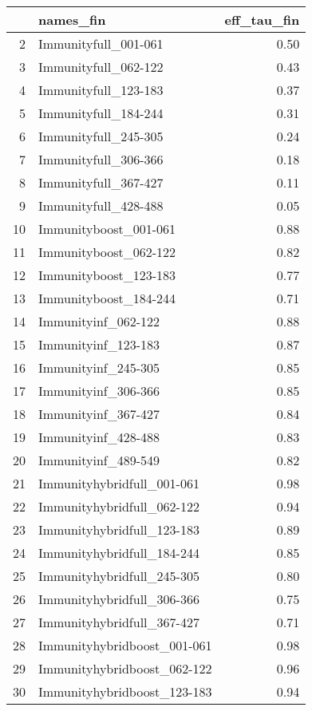 \begin{table}[ht]
\centering
\begin{tabular}{rlr}
  \hline
 & names\_fin & eff\_tau\_fin \\ 
  \hline
2 & Immunityfull\_001-061 & 0.50 \\ 
  3 & Immunityfull\_062-122 & 0.43 \\ 
  4 & Immunityfull\_123-183 & 0.37 \\ 
  5 & Immunityfull\_184-244 & 0.31 \\ 
  6 & Immunityfull\_245-305 & 0.24 \\ 
  7 & Immunityfull\_306-366 & 0.18 \\ 
  8 & Immunityfull\_367-427 & 0.11 \\ 
  9 & Immunityfull\_428-488 & 0.05 \\ 
  10 & Immunityboost\_001-061 & 0.88 \\ 
  11 & Immunityboost\_062-122 & 0.82 \\ 
  12 & Immunityboost\_123-183 & 0.77 \\ 
  13 & Immunityboost\_184-244 & 0.71 \\ 
  14 & Immunityinf\_062-122 & 0.88 \\ 
  15 & Immunityinf\_123-183 & 0.87 \\ 
  16 & Immunityinf\_245-305 & 0.85 \\ 
  17 & Immunityinf\_306-366 & 0.85 \\ 
  18 & Immunityinf\_367-427 & 0.84 \\ 
  19 & Immunityinf\_428-488 & 0.83 \\ 
  20 & Immunityinf\_489-549 & 0.82 \\ 
  21 & Immunityhybridfull\_001-061 & 0.98 \\ 
  22 & Immunityhybridfull\_062-122 & 0.94 \\ 
  23 & Immunityhybridfull\_123-183 & 0.89 \\ 
  24 & Immunityhybridfull\_184-244 & 0.85 \\ 
  25 & Immunityhybridfull\_245-305 & 0.80 \\ 
  26 & Immunityhybridfull\_306-366 & 0.75 \\ 
  27 & Immunityhybridfull\_367-427 & 0.71 \\ 
  28 & Immunityhybridboost\_001-061 & 0.98 \\ 
  29 & Immunityhybridboost\_062-122 & 0.96 \\ 
  30 & Immunityhybridboost\_123-183 & 0.94 \\ 
   \hline
\end{tabular}
\end{table}
